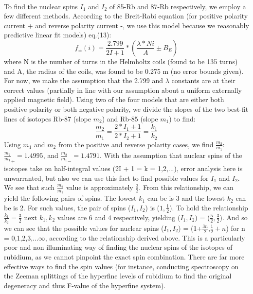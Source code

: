 \documentclass{article}
\begin{document}
\\\indent To find the nuclear spins $I_1$ and $I_2$ of 85-Rb and 87-Rb respectively, we employ a few different methods. According to the Breit-Rabi equation (for positive polarity current + and reverse polarity current -, we use this model because we reasonably predictive linear fit models) eq.(13):
\begin{equation}
        f_\pm(i) = \frac{2.799}{2I+1}*(\frac{\lambda*Ni}{A} \pm B_E)
\end{equation}
where N is the number of turns in the Helmholtz coils (found to be 135 turns) and A, the radius of the coils, was found to be 0.275 m (no error bounds given). For now, we make the assumption that the 2.799 and $\lambda$ constants are at their correct values (partially in line with our assumption about a uniform externally applied magnetic field). Using two of the four models that are either both positive polarity or both negative polarity, we divide the slopes of the two best-fit lines of isotopes Rb-87 (slope $m_2$) and Rb-85 (slope $m_1$) to find:
\begin{equation}
        \frac{m_2}{m_1} = \frac{2*I_1 + 1}{2*I_2 + 1} = \frac{k_1}{k_2}
\end{equation}
Using $m_1$ and $m_2$ from the positive and reverse polarity cases, we find $\frac{m_2}{m_1}$: $\frac{m_2}{m_1}_+ = 1.4995$, and $\frac{m_2}{m_1}_- = 1.4791$.
With the assumption that nuclear spins of the isotopes take on half-integral values (2I + 1 = k = 1,2,...), error analysis here is unwarranted, but also we can use this fact to find possible values for $I_1$ and $I_2$. We see that such $\frac{m_2}{m_1}$ value is approximately $\frac{3}{2}$. From this relationship, we can yield the following pairs of spins. The lowest $k_1$ can be is 3 and the lowest $k_2$ can be is 2. For such values, the pair of spins ($I_1,I_2$) is ($1,\frac{1}{2}$). To hold the relationship $\frac{k_1}{k_2} = \frac{3}{2}$ next $k_1, k_2$ values are 6 and 4 respectively, yielding ($I_1,I_2$) = ($\frac{5}{2},\frac{3}{2}$). And so we can see that the possible values for nuclear spins ($I_1,I_2$) = (1+$\frac{3n}{2}$,$\frac{1}{2}+n$) for n = 0,1,2,3,...$\infty$, according to the relationship derived above. This is a particularly poor and non illuminating way of finding the nuclear spins of the isotopes of rubidium, as we cannot pinpoint the exact spin combination. There are far more effective ways to find the spin values (for instance, conducting spectroscopy on the Zeeman splittings of the hyperfine levels of rubidium to find the original degeneracy and thus F-value of the hyperfine system).
\end{document}
